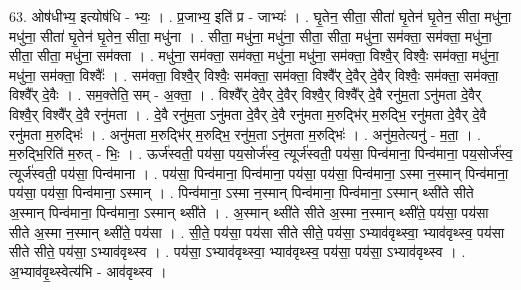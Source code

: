 \documentclass[17pt]{extarticle}
\begin{document}
63. ओष॑धीभ्य॒ इत्योष॑धि - भ्यः॒ । . प्र॒जाभ्य॒ इति॑ प्र - जाभ्यः॑ । . घृ॒तेन॒ सीता॒ सीता॑ घृ॒तेन॑ घृ॒तेन॒ सीता॒ मधु॑ना॒ मधु॑ना॒ सीता॑ घृ॒तेन॑ घृ॒तेन॒ सीता॒ मधु॑ना । . सीता॒ मधु॑ना॒ मधु॑ना॒ सीता॒ सीता॒ मधु॑ना॒ सम॑क्ता॒ सम॑क्ता॒ मधु॑ना॒ सीता॒ सीता॒ मधु॑ना॒ सम॑क्ता । . मधु॑ना॒ सम॑क्ता॒ सम॑क्ता॒ मधु॑ना॒ मधु॑ना॒ सम॑क्ता॒ विश्वै॒र् विश्वैः॒ सम॑क्ता॒ मधु॑ना॒ मधु॑ना॒ सम॑क्ता॒ विश्वैः᳚ । . सम॑क्ता॒ विश्वै॒र् विश्वैः॒ सम॑क्ता॒ सम॑क्ता॒ विश्वै᳚र् दे॒वैर् दे॒वैर् विश्वैः॒ सम॑क्ता॒ सम॑क्ता॒ विश्वै᳚र् दे॒वैः । . सम॒क्तेति॒ सम् - अ॒क्ता॒ । . विश्वै᳚र् दे॒वैर् दे॒वैर् विश्वै॒र् विश्वै᳚र् दे॒वै रनु॑म॒ता ऽनु॑मता दे॒वैर् विश्वै॒र् विश्वै᳚र् दे॒वै रनु॑मता । . दे॒वै रनु॑म॒ता ऽनु॑मता दे॒वैर् दे॒वै रनु॑मता म॒रुद्भि॑र् म॒रुद्भि॒ रनु॑मता दे॒वैर् दे॒वै रनु॑मता म॒रुद्भिः॑ । . अनु॑मता म॒रुद्भि॑र् म॒रुद्भि॒ रनु॑म॒ता ऽनु॑मता म॒रुद्भिः॑ । . अनु॑म॒तेत्यनु॑ - म॒ता॒ । . म॒रुद्भि॒रिति॑ म॒रुत् - भिः॒ । . ऊर्ज॑स्वती॒ पय॑सा॒ पय॒सोर्ज॑स्व॒ त्यूर्ज॑स्वती॒ पय॑सा॒ पिन्व॑माना॒ पिन्व॑माना॒ पय॒सोर्ज॑स्व॒ त्यूर्ज॑स्वती॒ पय॑सा॒ पिन्व॑माना । . पय॑सा॒ पिन्व॑माना॒ पिन्व॑माना॒ पय॑सा॒ पय॑सा॒ पिन्व॑माना॒ ऽस्मा न॒स्मान् पिन्व॑माना॒ पय॑सा॒ पय॑सा॒ पिन्व॑माना॒ ऽस्मान् । . पिन्व॑माना॒ ऽस्मा न॒स्मान् पिन्व॑माना॒ पिन्व॑माना॒ ऽस्मान् थ्सी॑ते सीते अ॒स्मान् पिन्व॑माना॒ पिन्व॑माना॒ ऽस्मान् थ्सी॑ते । . अ॒स्मान् थ्सी॑ते सीते अ॒स्मा न॒स्मान् थ्सी॑ते॒ पय॑सा॒ पय॑सा सीते अ॒स्मा न॒स्मान् थ्सी॑ते॒ पय॑सा । . सी॒ते॒ पय॑सा॒ पय॑सा सीते सीते॒ पय॑सा॒ ऽभ्याव॑वृथ्स्वा॒ भ्याव॑वृथ्स्व॒ पय॑सा सीते सीते॒ पय॑सा॒ ऽभ्याव॑वृथ्स्व । . पय॑सा॒ ऽभ्याव॑वृथ्स्वा॒ भ्याव॑वृथ्स्व॒ पय॑सा॒ पय॑सा॒ ऽभ्याव॑वृथ्स्व । . अ॒भ्याव॑वृ॒थ्स्वेत्य॑भि - आव॑वृथ्स्व । \newline
\pagebreak
{}
\end{document}
